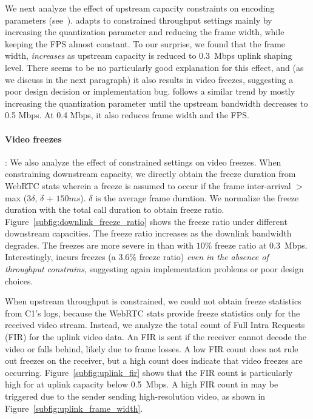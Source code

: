 We next analyze the effect of upstream capacity constraints on encoding
parameters
(see~).
\teams adapts to constrained throughput settings mainly by increasing the
quantization parameter and reducing the frame width, while keeping the FPS
almost constant. To our surprise, we found that the frame width, {\em
increases} as upstream capacity is reduced to 0.3~Mbps uplink shaping level.
There seems to be no particularly good explanation for this effect, and (as we
discuss in the next paragraph) it also results in video freezes, suggesting a
poor design decision or implementation bug.  \meet follows a similar trend by
mostly increasing the quantization parameter until the upstream bandwidth
decreases to 0.5 Mbps. At 0.4 Mbps, it also reduces frame width and the FPS. 

\paragraph{Video freezes}: We also analyze the effect of constrained settings
on video freezes. When constraining downstream capacity, we directly obtain the freeze duration
from WebRTC stats wherein a freeze is assumed to occur if the frame
inter-arrival $>$ max (3$\delta$, $\delta$ + $150 ms$). $\delta$ is the
average frame duration. We normalize the freeze duration with the total call
duration to obtain freeze ratio.  Figure~\ref{subfig:downlink_freeze_ratio}
shows the freeze ratio under different downstream capacities. The freeze ratio
increases as the downlink bandwidth degrades. The freezes are more severe in
\meet than \teamsbrowser with $10\%$ freeze ratio at 0.3~Mbps. Interestingly,
\teamsbrowser incurs freezes (a $3.6\%$ freeze ratio) {\em even in the absence
of throughput constrains}, suggesting again implementation problems or poor
design choices.

When upstream throughput is constrained, we could not obtain freeze statistics
from C1's logs, because the WebRTC stats provide freeze statistics only for
the received video stream.  Instead, we analyze the total count of Full Intra
Requests (FIR) for the uplink video data. An FIR is sent if the receiver
cannot decode the video or falls behind, likely due to frame losses.  A low
FIR count does not rule out freezes on the receiver, but a high count does
indicate that video freezes are occurring.  Figure~\ref{subfig:uplink_fir}
shows that the FIR count is particularly high for \teamsbrowser at uplink
capacity below 0.5~Mbps. A high FIR count in \teamsbrowser may be triggered
due to the sender sending high-resolution video, as shown in
Figure~\ref{subfig:uplink_frame_width}.


